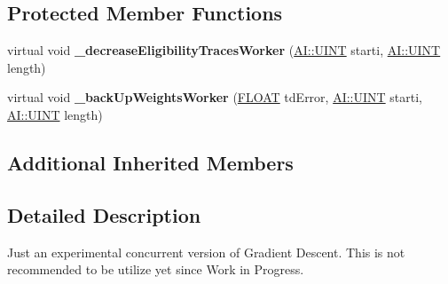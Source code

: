 \subsection*{Protected Member Functions}
\begin{DoxyCompactItemize}
\item 
\hypertarget{classAI_1_1Algorithm_1_1GradientDescentCC_a671233415fd282b198c6d0999e63832a}{virtual void {\bfseries \+\_\+decrease\+Eligibility\+Traces\+Worker} (\hyperlink{namespaceAI_ab6e14dc1e659854858a87e511f1439ec}{A\+I\+::\+U\+I\+N\+T} starti, \hyperlink{namespaceAI_ab6e14dc1e659854858a87e511f1439ec}{A\+I\+::\+U\+I\+N\+T} length)}\label{classAI_1_1Algorithm_1_1GradientDescentCC_a671233415fd282b198c6d0999e63832a}

\item 
\hypertarget{classAI_1_1Algorithm_1_1GradientDescentCC_a647a9d1f60731c366695a7c1fac008d4}{virtual void {\bfseries \+\_\+back\+Up\+Weights\+Worker} (\hyperlink{namespaceAI_a41b74884a20833db653dded3918e05c3}{F\+L\+O\+A\+T} td\+Error, \hyperlink{namespaceAI_ab6e14dc1e659854858a87e511f1439ec}{A\+I\+::\+U\+I\+N\+T} starti, \hyperlink{namespaceAI_ab6e14dc1e659854858a87e511f1439ec}{A\+I\+::\+U\+I\+N\+T} length)}\label{classAI_1_1Algorithm_1_1GradientDescentCC_a647a9d1f60731c366695a7c1fac008d4}

\end{DoxyCompactItemize}
\subsection*{Additional Inherited Members}


\subsection{Detailed Description}
Just an experimental concurrent version of Gradient Descent. This is not recommended to be utilize yet since Work in Progress. 

